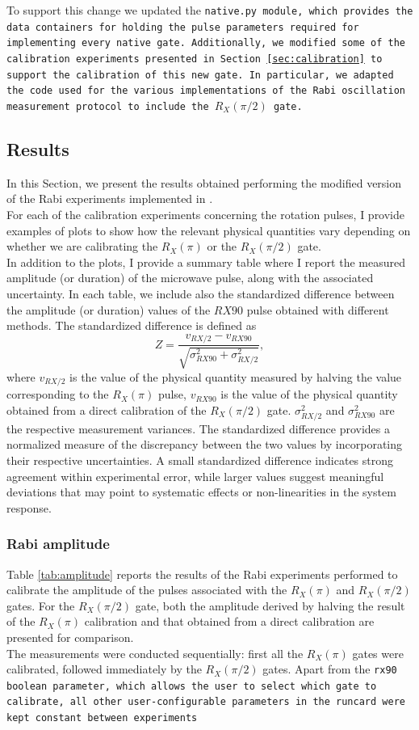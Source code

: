 To support this change we updated the \tt{native.py} module, which provides the data containers for holding the pulse parameters required for implementing every native gate.
Additionally, we modified some of the calibration experiments presented in Section \ref{sec:calibration} to support the calibration of this new gate.
In particular, we adapted the code used for the various implementations of the Rabi oscillation measurement protocol to include the $R_X(\pi/2)$ gate.

\subsection{Results}
In this Section, we present the results obtained performing the modified version of the Rabi experiments implemented in \Qibocal.\\
For each of the calibration experiments concerning the rotation pulses, I provide examples of plots to show how the relevant physical quantities vary depending on whether we are calibrating the $R_X(\pi)$ or the $R_X(\pi/2)$ gate.\\
In addition to the plots, I provide a summary table where I report the measured amplitude (or duration) of the microwave pulse, along with the associated uncertainty.
In each table, we include also the standardized difference between the amplitude (or duration) values of the $RX90$ pulse obtained with different methods.
The standardized difference is defined as
\begin{equation}\label{eq:std_difference}
    Z = \frac{v_{RX/2}-v_{RX90}}{\sqrt{\sigma^2_{RX90} + \sigma^2_{RX/2}}},
\end{equation}
where $v_{RX/2}$ is the value of the physical quantity measured by halving the value corresponding to the $R_X(\pi)$ pulse, $v_{RX90}$ is the value of the physical quantity obtained from a direct calibration of the $R_X(\pi/2)$ gate.
$\sigma^2_{RX/2}$ and $\sigma^2_{RX90}$ are the respective measurement variances.
The standardized difference provides a normalized measure of the discrepancy between the two values by incorporating their respective uncertainties. 
A small standardized difference indicates strong agreement within experimental error, while larger values suggest meaningful deviations that may point to systematic effects or non-linearities in the system response.

\subsubsection{Rabi amplitude}
Table \ref{tab:amplitude} reports the results of the Rabi experiments performed to calibrate the amplitude of the pulses associated with the $R_X(\pi)$ and $R_X(\pi/2)$ gates.
For the $R_X(\pi/2)$ gate, both the amplitude derived by halving the result of the $R_X(\pi)$ calibration and that obtained from a direct calibration are presented for comparison.\\
The measurements were conducted sequentially: first all the $R_X(\pi)$ gates were calibrated, followed immediately by the $R_X(\pi/2)$ gates. 
Apart from the \tt{rx90} boolean parameter, which allows the user to select which gate to calibrate, all other user-configurable parameters in the runcard were kept constant between experiments
